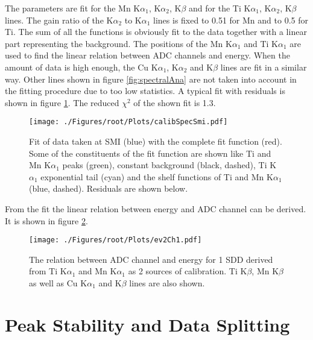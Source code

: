 The parameters are fit for the Mn K$\alpha_{1}$, K$\alpha_{2}$, K$\beta$ and for the Ti K$\alpha_{1}$, K$\alpha_{2}$, K$\beta$ lines. The gain ratio of the K$\alpha_{2}$ to K$\alpha_{1}$ lines is fixed to 0.51 for Mn and to 0.5 for Ti. The sum of all the functions is obviously fit to the data together with a linear part representing the background. The positions of the Mn K$\alpha_{1}$ and Ti K$\alpha_{1}$ are used to find the linear relation between ADC channels and energy. When the amount of data is high enough, the Cu K$\alpha_{1}$, K$\alpha_{2}$ and K$\beta$ lines are fit in a similar way. Other lines shown in figure \ref{fig:spectralAna} are not taken into account in the fitting procedure due to too low statistics. A typical fit with residuals is shown in figure \ref{fig:fitSdd4Smi}. The reduced $\chi^{2}$ of the shown fit is 1.3.
\begin{figure}[h]
 \centering
 \texttt{[image: ./Figures/root/Plots/calibSpecSmi.pdf]}
 \caption{Fit of data taken at SMI (blue) with the complete fit function (red). Some of the constituents of the fit function are shown like Ti and Mn K$\alpha_{1}$ peaks (green), constant background (black, dashed), Ti K$\alpha_{1}$ exponential tail (cyan) and the shelf functions of Ti and Mn K$\alpha_{1}$ (blue, dashed). Residuals are shown below.}
 \label{fig:fitSdd4Smi}
\end{figure}
From the fit the linear relation between energy and ADC channel can be derived. It is shown in figure \ref{fig:ev2ch}.
\begin{figure}[h]
 \centering
 \texttt{[image: ./Figures/root/Plots/ev2Ch1.pdf]}
 \caption{The relation between ADC channel and energy for 1 SDD derived from Ti K$\alpha_{1}$ and Mn K$\alpha_{1}$ as 2 sources of calibration. Ti K$\beta$, Mn K$\beta$ as well as Cu K$\alpha_{1}$ and  K$\beta$ lines are also shown.}
 \label{fig:ev2ch}
\end{figure}


\section{Peak Stability and Data Splitting}
\label{sec:PeakStab}

